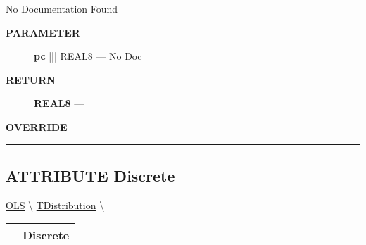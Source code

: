 \par





No Documentation Found






\par
\begin{description}
\item [\colorbox{tagtype}{\color{white} \textbf{\textsf{PARAMETER}}}] \textbf{\underline{pc}} ||| REAL8 --- No Doc
\end{description}







\par
\begin{description}
\item [\colorbox{tagtype}{\color{white} \textbf{\textsf{RETURN}}}] \textbf{REAL8} --- 
\end{description}






\par
\begin{description}
\item [\colorbox{tagtype}{\color{white} \textbf{\textsf{OVERRIDE}}}] 
\end{description}



\rule{\linewidth}{0.5pt}
\subsection*{\textsf{\colorbox{headtoc}{\color{white} ATTRIBUTE}
Discrete}}

\hypertarget{ecldoc:linearregression.ols.distributionbase.discrete}{}
\hspace{0pt} \hyperlink{ecldoc:linearregression.ols}{OLS} \textbackslash 
\hspace{0pt} \hyperlink{ecldoc:linearregression.ols.tdistribution}{TDistribution} \textbackslash 

{\renewcommand{\arraystretch}{1.5}
\begin{tabularx}{\textwidth}{|>{\raggedright\arraybackslash}l|X|}
\hline
\hspace{0pt}\mytexttt{\color{red} } & \textbf{Discrete} \\
\hline
\end{tabularx}
}

